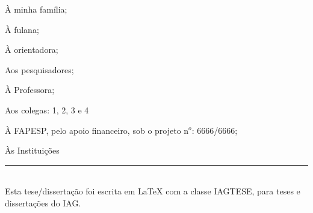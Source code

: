 À minha família;

À fulana;

À orientadora;

Aos pesquisadores;

À Professora;

Aos colegas: 1, 2, 3 e 4

À FAPESP, pelo apoio financeiro, sob o projeto n$^o$: 6666/6666;

Às Instituições

\vfill

\begin{flushleft}
\rule{6cm}{0.5pt}\\
{\footnotesize{Esta tese/dissertação foi escrita em \LaTeX{} com a classe IAGTESE, para teses e dissertações do IAG.}}
\end{flushleft}